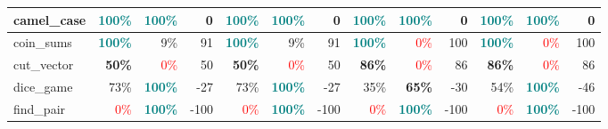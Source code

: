 \begin{table}[!h]
{\begin{tabular}{|p{2.9cm}|rr|r|rr|r||rr|r|rr|r|}
		camel\_case        & \textcolor{teal}{100\%}              & \multicolumn{1}{r|}{\textcolor{teal}{100\%}}          & \cellcolor[HTML]{FFFFFF}0    & \textcolor{teal}{100\%}          & \multicolumn{1}{r|}{\textcolor{teal}{100\%}}          & \cellcolor[HTML]{FFFFFF}0    & \textcolor{teal}{100\%}              & \multicolumn{1}{r|}{\textcolor{teal}{100\%}} & \cellcolor[HTML]{FFFFFF}0    & \textcolor{teal}{100\%}          & \multicolumn{1}{r|}{\textcolor{teal}{100\%}}          & \cellcolor[HTML]{FFFFFF}0    \\ \hline
		coin\_sums         & \textcolor{teal}{\textbf{100\%}}     & \multicolumn{1}{r|}{9\%}                              & \cellcolor[HTML]{FFA317}91   & \textcolor{teal}{\textbf{100\%}} & \multicolumn{1}{r|}{9\%}                              & \cellcolor[HTML]{FFA317}91   & \textcolor{teal}{\textbf{100\%}}     & \multicolumn{1}{r|}{\textcolor{red}{0\%}}    & \cellcolor[HTML]{FF9900}100  & \textcolor{teal}{\textbf{100\%}} & \multicolumn{1}{r|}{\textcolor{red}{0\%}}             & \cellcolor[HTML]{FF9900}100  \\ \hline
		cut\_vector        & \textbf{50\%}                        & \multicolumn{1}{r|}{\textcolor{red}{0\%}}             & \cellcolor[HTML]{FFCC80}50   & \textbf{50\%}                    & \multicolumn{1}{r|}{\textcolor{red}{0\%}}             & \cellcolor[HTML]{FFCC80}50   & \textbf{86\%}                        & \multicolumn{1}{r|}{\textcolor{red}{0\%}}    & \cellcolor[HTML]{FFA824}86   & \textbf{86\%}                    & \multicolumn{1}{r|}{\textcolor{red}{0\%}}             & \cellcolor[HTML]{FFA824}86   \\ \hline
		dice\_game         & 73\%                                 & \multicolumn{1}{r|}{\textcolor{teal}{\textbf{100\%}}} & \cellcolor[HTML]{CEDEF8}-27  & 73\%                             & \multicolumn{1}{r|}{\textcolor{teal}{\textbf{100\%}}} & \cellcolor[HTML]{CEDEF8}-27  & 35\%                                 & \multicolumn{1}{r|}{\textbf{65\%}}                    & \cellcolor[HTML]{C8DAF8}-30  & 54\%                             & \multicolumn{1}{r|}{\textcolor{teal}{\textbf{100\%}}} & \cellcolor[HTML]{ABC7F4}-46  \\ \hline
		find\_pair         & \textcolor{red}{0\%}                 & \multicolumn{1}{r|}{\textcolor{teal}{\textbf{100\%}}} & \cellcolor[HTML]{4A86E8}-100 & \textcolor{red}{0\%}             & \multicolumn{1}{r|}{\textcolor{teal}{\textbf{100\%}}} & \cellcolor[HTML]{4A86E8}-100 & \textcolor{red}{0\%}                 & \multicolumn{1}{r|}{\textcolor{teal}{\textbf{100\%}}} & \cellcolor[HTML]{4A86E8}-100 & \textcolor{red}{0\%}             & \multicolumn{1}{r|}{\textcolor{teal}{\textbf{100\%}}} & \cellcolor[HTML]{4A86E8}-100 \\ \hline

\end{tabular}}
\end{table}
